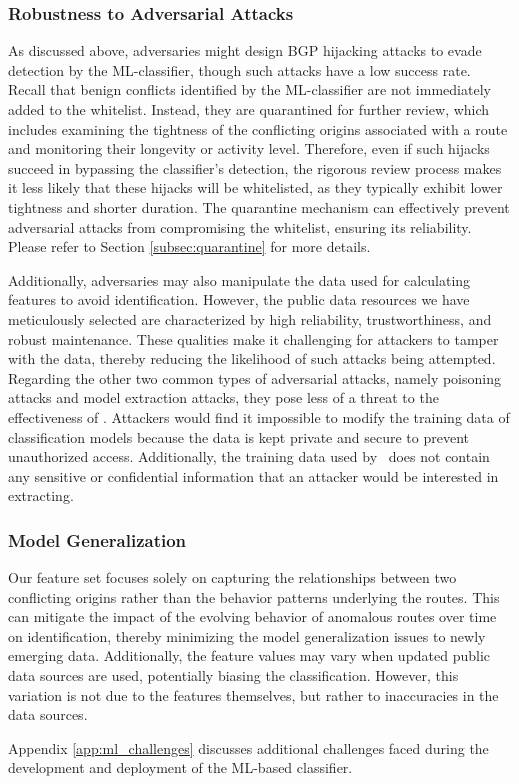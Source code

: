\vspace{-5pt}
\subsubsection{Robustness to Adversarial Attacks} \label{subsubsec:robustness}
As discussed above, adversaries might design BGP hijacking attacks to evade detection by the ML-classifier, though such attacks have a low success rate.
Recall that benign conflicts identified by the ML-classifier are not immediately added to the whitelist. Instead, they are quarantined for further review, which includes examining the tightness of the conflicting origins associated with a route and monitoring their longevity or activity level. Therefore, even if such hijacks succeed in bypassing the classifier's detection, the rigorous review process makes it less likely that these hijacks will be whitelisted, as they typically exhibit lower tightness and shorter duration.
The quarantine mechanism can effectively prevent adversarial attacks from compromising the whitelist, ensuring its reliability.
Please refer to Section \ref{subsec:quarantine} for more details.

Additionally, adversaries may also manipulate the data used for calculating features to avoid identification. However, the public data resources we have meticulously selected are characterized by high reliability, trustworthiness, and robust maintenance. These qualities make it challenging for attackers to tamper with the data, thereby reducing the likelihood of such attacks being attempted.
Regarding the other two common types of adversarial attacks, namely poisoning attacks and model extraction attacks, they pose less of a threat to the effectiveness of \lov. Attackers would find it impossible to modify the training data of classification models because the data is kept private and secure to prevent unauthorized access. Additionally, the training data used by \lov\ does not contain any sensitive or confidential information that an attacker would be interested in extracting.
\vspace{-8pt}
\subsubsection{Model Generalization} \label{subsubsec:model_general}
Our feature set focuses solely on capturing the relationships between two conflicting origins rather than the behavior patterns underlying the routes.
This can mitigate the impact of the evolving behavior of anomalous routes over time on identification, thereby minimizing the model generalization issues to newly emerging data.
Additionally, the feature values may vary when updated public data sources are used, potentially biasing the classification. However, this variation is not due to the features themselves, but rather to inaccuracies in the data sources.

Appendix \ref{app:ml_challenges} discusses additional challenges faced during the development and deployment of the ML-based classifier.




 

